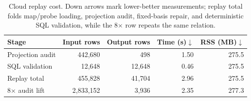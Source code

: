 \begin{table}[t]
\centering
\caption{Cloud replay cost. Down arrows mark lower-better measurements; replay total folds map/probe loading, projection audit, fixed-basis repair, and deterministic SQL validation, while the 8$\times$ row repeats the same relation.}
\label{tab:resource-profile}
\footnotesize
\setlength{\tabcolsep}{3.0pt}
\begin{tabular}{@{}lrrrr@{}}
\toprule
Stage & Input rows & Output rows & Time (s)$\downarrow$ & RSS (MB)$\downarrow$ \\
\midrule
Projection audit & 442,680 & 498 & 1.50 & 275.5 \\
SQL validation & 12,648 & 12,648 & 0.46 & 275.5 \\
Replay total & 455,828 & 41,704 & 2.96 & 275.5 \\
8$\times$ audit lift & 2,833,152 & 3,936 & 2.35 & 277.3 \\
\bottomrule
\end{tabular}
\end{table}
